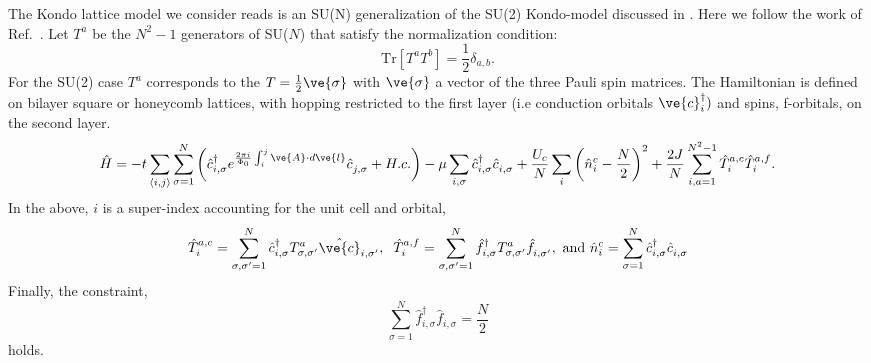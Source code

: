 

The Kondo lattice model we consider reads is an SU(N) generalization of the SU(2) Kondo-model   discussed in \cite{Capponi00,Assaad99a}.   Here we follow the work of  Ref.~\cite{Raczkowski20}. Let 
$T^{a}$ be the  $N^2 -1  $ generators of SU($N$)   that  satisfy the normalization condition: 
\begin{equation}
	\text{Tr}  \left[ T^{a} T^{b} \right]   = \frac{1}{2}\delta_{a,b}.
\label{Normalization_condition.eq}
\end{equation}
For the SU(2) case $T^{a}$  corresponds to the $T  = \frac{1}{2} \ve{\sigma}$ with $\ve{\sigma}$   a vector of the three Pauli spin matrices.      The   Hamiltonian is defined on bilayer  square or honeycomb lattices, with  hopping restricted to the  first layer  (i.e  conduction orbitals $\ve{c}^{\dagger}_{i}  )$   and  spins, f-orbitals, on the second layer. 
\begin{equation}
	\hat{H}     =   - t  \sum_{\langle i,j \rangle}    \sum_{\sigma=1}^{N}  \left(  \hat{c}^{\dagger}_{i,\sigma}  e^{\frac{2\pi i}{\Phi_0}  \int_{i}^{j} \ve{A}\cdot d \ve{l}}\hat{c}^{\phantom\dagger}_{j,\sigma}   + H.c.  \right)  - \mu \sum_{i,\sigma} \hat{c}^{\dagger}_{i,\sigma}  \hat{c}^{\phantom\dagger}_{i,\sigma} 
	+    \frac{U_c}{N}  \sum_{i}   \left( \hat{n}^c_i -  \frac{N}{2} \right)^2  
         +  \frac{2 J}{N} \sum_{i, a=1  }^{N^2 -1}  \hat{T}^{a,c}_{i}  \hat{T}^{a,f}_{i}. 
\label{Kondo_SUN_Ham.eq}
\end{equation}
In the above,  $i$ is a super-index  accounting for the unit cell and orbital,
\begin{equation}
	 \hat{T}^{a,c}_{i}   =   \sum_{\sigma,\sigma'=1}^{N} \hat{c}^{\dagger}_{i,\sigma}T^{a}_{\sigma,\sigma'}  \hat{\ve{c}}^{\phantom\dagger}_{i,\sigma'}, \; \; 
	  \hat{T}^{a,f}_{i}   = \sum_{\sigma,\sigma'=1}^{N} \hat{f}^{\dagger}_{i,\sigma} T^{a}_{\sigma,\sigma'}  \hat{f}^{\phantom\dagger}_{i,\sigma'},  
	  \text{   and  }   \hat{n}^c_i  = \sum_{\sigma=1}^{N} \hat{c}_{i,\sigma}^{\dagger} \hat{c}_{i,\sigma}^{\phantom\dagger} 
\end{equation}
Finally, the constraint, 
\begin{equation}
   \sum_{\sigma=1}^{N}  \hat{f}^{\dagger}_{i,\sigma}   \hat{f}^{\phantom\dagger}_{i,\sigma}     = \frac{N}{2}
\end{equation}
holds.

